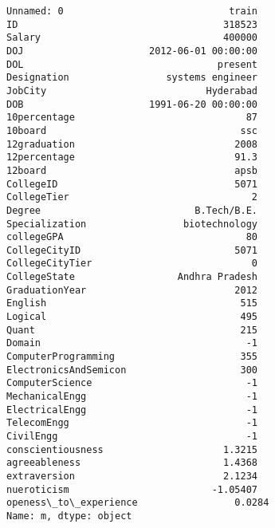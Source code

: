 \documentclass[11pt]{article}
\makeatletter
\newcommand{\boxspacing}{\kern\kvtcb@left@rule\kern\kvtcb@boxsep}
\newcommand{\prompt}[4]{
        \ttfamily\llap{{\color{#2}[#3]:\hspace{3pt}#4}}\vspace{-\baselineskip}
    }
\makeatother
\begin{document}
            \begin{tcolorbox}[breakable, size=fbox, boxrule=.5pt, pad at break*=1mm, opacityfill=0]
\prompt{Out}{outcolor}{72}{\boxspacing}
\begin{Verbatim}[commandchars=\\\{\}]
Unnamed: 0                             train
ID                                    318523
Salary                                400000
DOJ                      2012-06-01 00:00:00
DOL                                  present
Designation                 systems engineer
JobCity                            Hyderabad
DOB                      1991-06-20 00:00:00
10percentage                              87
10board                                  ssc
12graduation                            2008
12percentage                            91.3
12board                                 apsb
CollegeID                               5071
CollegeTier                                2
Degree                           B.Tech/B.E.
Specialization                 biotechnology
collegeGPA                                80
CollegeCityID                           5071
CollegeCityTier                            0
CollegeState                  Andhra Pradesh
GraduationYear                          2012
English                                  515
Logical                                  495
Quant                                    215
Domain                                    -1
ComputerProgramming                      355
ElectronicsAndSemicon                    300
ComputerScience                           -1
MechanicalEngg                            -1
ElectricalEngg                            -1
TelecomEngg                               -1
CivilEngg                                 -1
conscientiousness                     1.3215
agreeableness                         1.4368
extraversion                          2.1234
nueroticism                         -1.05407
openess\_to\_experience                 0.0284
Name: m, dtype: object
\end{Verbatim}
\end{tcolorbox}
        
    \begin{tcolorbox}[breakable, size=fbox, boxrule=1pt, pad at break*=1mm,colback=cellbackground, colframe=cellborder]
\prompt{In}{incolor}{ }{\boxspacing}
\begin{Verbatim}[commandchars=\\\{\}]

\end{Verbatim}
\end{tcolorbox}


    
    
    
\end{document}
